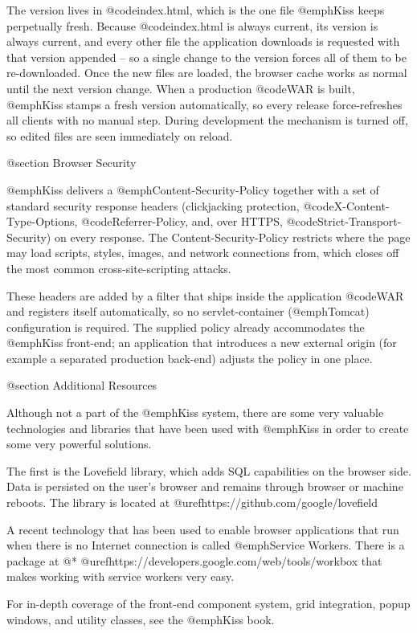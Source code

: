 The version lives in @code{index.html}, which is the one file @emph{Kiss}
keeps perpetually fresh.  Because @code{index.html} is always current,
its version is always current, and every other file the application
downloads is requested with that version appended -- so a single change
to the version forces all of them to be re-downloaded.  Once the new
files are loaded, the browser cache works as normal until the next
version change.  When a production @code{WAR} is built, @emph{Kiss}
stamps a fresh version automatically, so every release force-refreshes
all clients with no manual step.  During development the mechanism is
turned off, so edited files are seen immediately on reload.

@section Browser Security

@emph{Kiss} delivers a @emph{Content-Security-Policy} together with a set
of standard security response headers (clickjacking protection,
@code{X-Content-Type-Options}, @code{Referrer-Policy}, and, over HTTPS,
@code{Strict-Transport-Security}) on every response.  The
Content-Security-Policy restricts where the page may load scripts,
styles, images, and network connections from, which closes off the most
common cross-site-scripting attacks.

These headers are added by a filter that ships inside the application
@code{WAR} and registers itself automatically, so no servlet-container
(@emph{Tomcat}) configuration is required.  The supplied policy already
accommodates the @emph{Kiss} front-end; an application that introduces a
new external origin (for example a separated production back-end) adjusts
the policy in one place.

@section Additional Resources

Although not a part of the @emph{Kiss} system, there are some very
valuable technologies and libraries that have been used with
@emph{Kiss} in order to create some very powerful solutions.

The first is the Lovefield library, which adds SQL capabilities on the
browser side.  Data is persisted on the user's browser and remains
through browser or machine reboots.  The library is located at
@uref{https://github.com/google/lovefield}

A recent technology that has been used to enable browser applications
that run when there is no Internet connection is called @emph{Service
Workers}.  There is a package at @*
@uref{https://developers.google.com/web/tools/workbox} that makes
working with service workers very easy.

For in-depth coverage of the front-end component system, grid
integration, popup windows, and utility classes, see the @emph{Kiss}
book.



